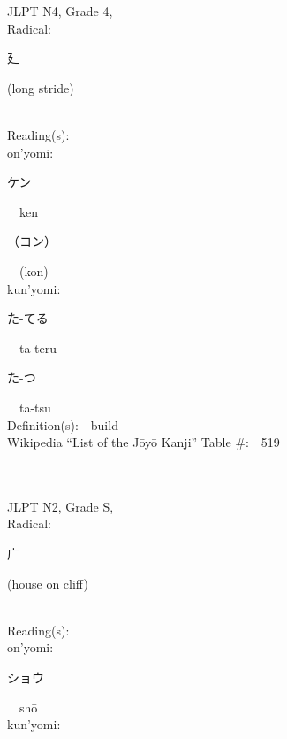 \begin{multicols}{2}
{JLPT N4, Grade 4, \\Radical:\ \ {\begin{CJK}{UTF8}{min} 廴 \end{CJK}} (long stride) } \\
Reading(s):\ \ \\
{\hspace*{1em}}on'yomi:\ \ \\
{\hspace*{2em}}{\begin{CJK}{UTF8}{min} ケン \end{CJK}}\ \ ken\ \ \\
{\hspace*{2em}}{\begin{CJK}{UTF8}{min} （コン） \end{CJK}}\ \ (kon)\ \ \\
{\hspace*{1em}}kun'yomi:\ \ \\
{\hspace*{2em}}{\begin{CJK}{UTF8}{min} た-てる \end{CJK}}\ \ ta-teru\ \ \\
{\hspace*{2em}}{\begin{CJK}{UTF8}{min} た-つ \end{CJK}}\ \ ta-tsu\ \ \\
Definition(s):\ \ build \\
Wikipedia ``List of the J\=oy\=o Kanji'' Table \#:\ \ 519 \\
\ \ \\
{\fontsize{34pt}{40pt}  }\ \ \\  %
{JLPT N2, Grade S, \\Radical:\ \ {\begin{CJK}{UTF8}{min} 广 \end{CJK}} (house on cliff) } \\
Reading(s):\ \ \\
{\hspace*{1em}}on'yomi:\ \ \\
{\hspace*{2em}}{\begin{CJK}{UTF8}{min} ショウ \end{CJK}}\ \ sh\=o\ \ \\
{\hspace*{1em}}kun'yomi:\ \ \\

\end{multicols}
